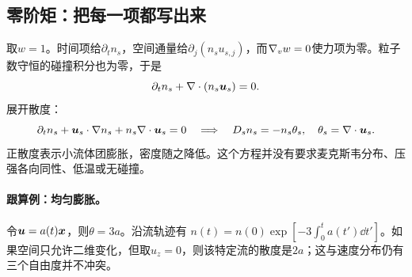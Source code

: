 \subsection{零阶矩：把每一项都写出来}
取$w=1$。时间项给$\partial_t n_s$，空间通量给$\partial_j(n_su_{s,j})$，而$\nabla_vw=0$使力项为零。粒子数守恒的碰撞积分也为零，于是
\begin{equation}
 \partial_tn_s+\nabla\cdot(n_s\bm{u}_s)=0.
 \label{eq:continuity}
\end{equation}
展开散度：
\begin{equation}
 \partial_t n_s+\bm{u}_s\cdot\nabla n_s+n_s\nabla\cdot\bm{u}_s=0
 \quad\Longrightarrow\quad
 D_sn_s=-n_s\theta_s,\quad\theta_s=\nabla\cdot\bm{u}_s.
\end{equation}
正散度表示小流体团膨胀，密度随之降低。这个方程并没有要求麦克斯韦分布、压强各向同性、低温或无碰撞。

\paragraph{跟算例：均匀膨胀。}
令$\bm{u}=a(t)\bm{x}$，则$\theta=3a$。沿流轨迹有
$n(t)=n(0)\exp[-3\int_0^ta(t')\dd t']$。如果空间只允许二维变化，但取$u_z=0$，则该特定流的散度是$2a$；这与速度分布仍有三个自由度并不冲突。

